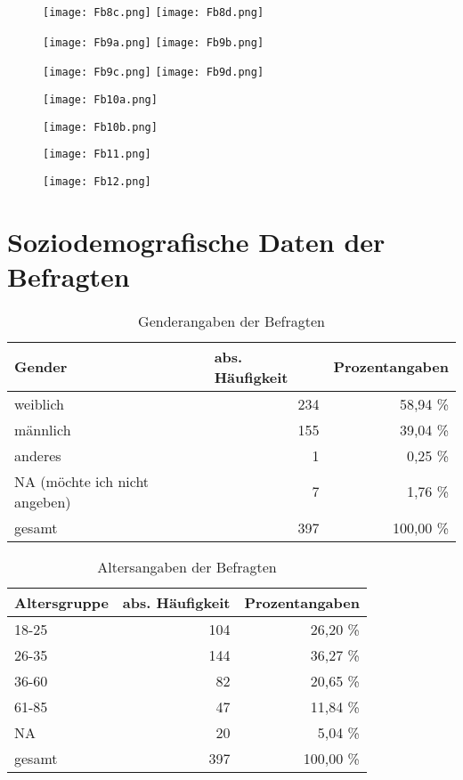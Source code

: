 \begin{figure}
\centering
\texttt{[image: Fb8c.png]}
\texttt{[image: Fb8d.png]}
\end{figure}
\begin{figure}
\centering
\texttt{[image: Fb9a.png]}
\texttt{[image: Fb9b.png]}
\end{figure}
\begin{figure}
\centering
\texttt{[image: Fb9c.png]}
\texttt{[image: Fb9d.png]}
\end{figure}
\begin{figure}
\centering
\texttt{[image: Fb10a.png]}
\end{figure}
\begin{figure}
\centering
\texttt{[image: Fb10b.png]}
\end{figure}
\begin{figure}
\centering
\texttt{[image: Fb11.png]}
\end{figure}
\begin{figure}
\centering
\texttt{[image: Fb12.png]}
\end{figure}
\section*{Soziodemografische Daten der Befragten}
\label{Anh:SoziodemografischeDaten}
\begin{table}
\centering
\begin{tabular}{lrr}
\textbf{Gender} & \multicolumn{1}{l}{\textbf{abs. Häufigkeit}} & \multicolumn{1}{l}{\textbf{Prozentangaben}} \\ \hline
weiblich & 234 & 58,94 \% \\ %
männlich & 155 & 39,04 \% \\ %
anderes & 1 & 0,25 \% \\ %
NA (möchte ich nicht angeben) & 7 & 1,76 \% \\ %
gesamt & 397 & 100,00 \%
\end{tabular}
\caption{Genderangaben der Befragten}
\label{table:GenderAnh}
\end{table}

\begin{table}
\centering
\begin{tabular}{lrr}
\textbf{Altersgruppe} & \multicolumn{1}{l}{\textbf{abs. Häufigkeit}} & \multicolumn{1}{l}{\textbf{Prozentangaben}} \\ \hline
18-25 & 104 & 26,20 \% \\ %
26-35 & 144 & 36,27 \% \\ %
36-60 & 82 & 20,65 \% \\ %
61-85 & 47 & 11,84 \% \\ %
NA & 20 & 5,04 \% \\ %
gesamt & 397 & 100,00 \%
\end{tabular}
\caption{Altersangaben der Befragten}
\label{table:AltersgruppenAnh}
\end{table}

